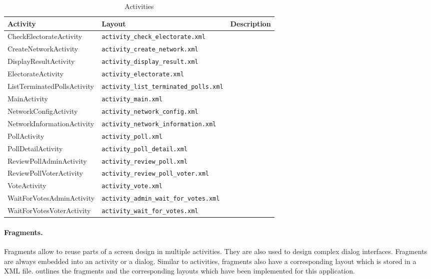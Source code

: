 \documentclass[numbers=noenddot, abstract=on, a4paper, headsepline,
footsepline, oneside, draft=off]{scrreprt}
\begin{document}
\begin{table}[htbp]
	\centering
	\begin{tabularx}{\textwidth}{llX}
		\toprule
		\textbf{Activity}			& \textbf{Layout}							& 	\textbf{Description}			\\
		\midrule
		CheckElectorateActivity 	& \texttt{activity\_check\_electorate.xml} 				&		\\
		CreateNetworkActivity		& \texttt{activity\_create\_network.xml}				&		\\
		DisplayResultActivity		& \texttt{activity\_display\_result.xml}				&		\\
		ElectorateActivity			& \texttt{activity\_electorate.xml}						&		\\
		ListTerminatedPollsActivity	& \texttt{activity\_list\_terminated\_polls.xml}		&		\\
		MainActivity				& \texttt{activity\_main.xml}							& 	 	\\
		NetworkConfigActivity		& \texttt{activity\_network\_config.xml}				&		\\
		NetworkInformationActivity	& \texttt{activity\_network\_information.xml}			&		\\
		PollActivity				& \texttt{activity\_poll.xml}							& 		\\
		PollDetailActivity			& \texttt{activity\_poll\_detail.xml}					&		\\
		ReviewPollAdminActivity		& \texttt{activity\_review\_poll.xml}					&		\\
		ReviewPollVoterActivity		& \texttt{activity\_review\_poll\_voter.xml}			&		\\
		VoteActivity				& \texttt{activity\_vote.xml}							&		\\
		WaitForVotesAdminActivity	& \texttt{activity\_admin\_wait\_for\_votes.xml}		&		\\
		WaitForVotesVoterActivity	& \texttt{activity\_wait\_for\_votes.xml}				&		\\
		
		\bottomrule
	\end{tabularx}
	\caption{Activities}
	\label{tab:activities}
\end{table}


\paragraph{Fragments.}
Fragments allow to reuse parts of a screen design in multiple activities. They
are also used to design complex dialog interfaces. Fragments are always embedded
into an activity or a dialog. Similar to activities,
fragments also have a corresponding layout which is stored
in a XML file.  outlines the fragments and the corresponding
layouts which have been implemented for this application.
\end{document}

